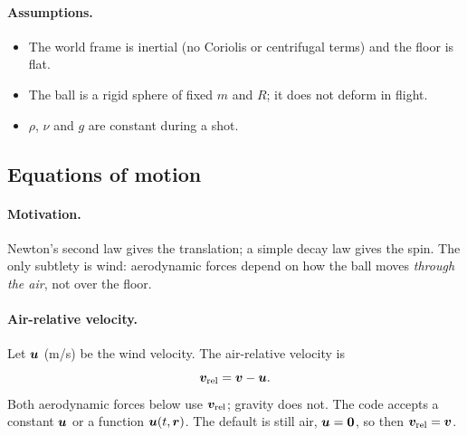 
\paragraph{Assumptions.}
\begin{itemize}
  \item The world frame is inertial (no Coriolis or centrifugal terms) and the floor is flat.
  \item The ball is a rigid sphere of fixed $m$ and $R$; it does not deform in flight.
  \item $\rho$, $\nu$ and $g$ are constant during a shot.
\end{itemize}

\subsection{Equations of motion}
\label{sec:flight-eom}

\paragraph{Motivation.}
Newton's second law gives the translation; a simple decay law gives the spin.
The only subtlety is wind: aerodynamic forces depend on how the ball moves \emph{through the air},
not over the floor.

\paragraph{Air-relative velocity.}
Let $\bm{u}$ (\unit{m/s}) be the wind velocity.
The air-relative velocity is
\begin{equation}
  \bm{v}_{\mathrm{rel}} = \bm{v} - \bm{u} .
  \label{eq:flight-vrel}
\end{equation}
Both aerodynamic forces below use $\bm{v}_{\mathrm{rel}}$; gravity does not.
The code accepts a constant $\bm{u}$ or a function $\bm{u}(t,\bm{r})$.
The default is still air, $\bm{u}=\bm{0}$, so then $\bm{v}_{\mathrm{rel}}=\bm{v}$.

